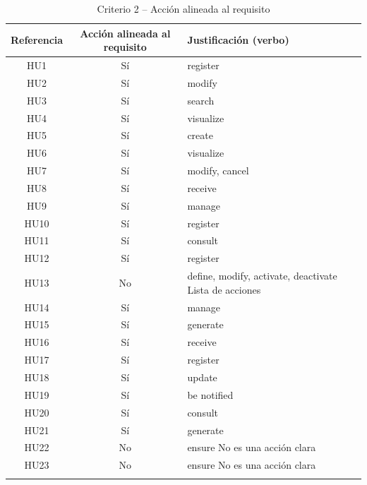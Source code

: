 \begin{longtable}{|c|c|p{6cm}|}
\hline
\textbf{Referencia} & \textbf{Acción alineada al requisito} & \textbf{Justificación (verbo)} \\
\hline
HU1 & Sí & register \\
\hline
HU2 & Sí & modify \\
\hline
HU3 & Sí & search \\
\hline
HU4 & Sí & visualize \\
\hline
HU5 & Sí & create \\
\hline
HU6 & Sí & visualize \\
\hline
HU7 & Sí & modify, cancel \\
\hline
HU8 & Sí & receive \\
\hline
HU9 & Sí & manage \\
\hline
HU10 & Sí & register \\
\hline
HU11 & Sí & consult \\
\hline
HU12 & Sí & register \\
\hline
HU13 & No & define, modify, activate, deactivate \newline Lista de acciones \\
\hline
HU14 & Sí & manage \\
\hline
HU15 & Sí & generate \\
\hline
HU16 & Sí & receive \\
\hline
HU17 & Sí & register \\
\hline
HU18 & Sí & update \\
\hline
HU19 & Sí & be notified \\
\hline
HU20 & Sí & consult \\
\hline
HU21 & Sí & generate \\
\hline
HU22 & No & ensure \newline No es una acción clara \\
\hline
HU23 & No & ensure \newline No es una acción clara \\
\hline
\caption{Criterio 2 – Acción alineada al requisito}
\end{longtable}

